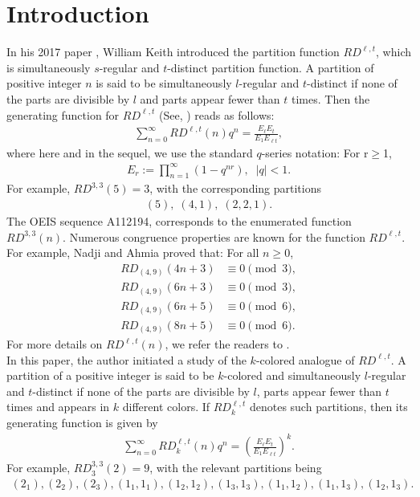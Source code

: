 \documentclass[11pt,a4paper]{article}
\numberwithin{equation}{section}
\theoremstyle{plain}
\begin{document}
	\section {Introduction}
	In his 2017 paper \cite{keith}, William Keith introduced the partition function $RD^{\ell,t}$, which is simultaneously $s$-regular and $t$-distinct partition function. 
	A partition of positive integer $n$ is said to be simultaneously $l$-regular and $t$-distinct if none of the parts are divisible by $l$ and parts appear fewer than $t$ times. Then the generating function for $RD^{\ell,t}$ (See, {{\cite[Th.3]{keith}}}) reads as follows:
	\begin{align*}
		\sum_{n=0}^{\infty} RD^{\ell,t}(n)q^n=
		\frac{E_{\ell}E_t}{E_1E_{\ell t}},
	\end{align*}
	where here and in the sequel, we use the standard $q$-series notation:
 For r$\geq$1, 
	\begin{align*}
		E_r:= \prod_{n=1}^{\infty}(1-q^{nr}), \;\; |q|<1.
	\end{align*}
	For example, $RD^{3,3}(5)=3$, with the corresponding partitions
	\begin{align*}
		(5),\;(4,1),\;(2,2,1).
	\end{align*}
	The OEIS sequence A112194, corresponds to the enumerated function $RD^{3,3}(n)$. Numerous congruence properties are known for the function  $RD^{\ell,t}$. For example, Nadji and Ahmia \cite{Ahmia 1 } proved that:
	For all $n \geq 0$,
	\begin{align*}
		RD_{(4,9)}(4n+3) &\equiv 0 \pmod{3},\\
		RD_{(4,9)}(6n+3) &\equiv 0 \pmod{3},\\
		RD_{(4,9)}(6n+5) &\equiv 0 \pmod{6},\\
		RD_{(4,9)}(8n+5) &\equiv 0 \pmod{6}.
		\end{align*}
	For more details on $RD^{\ell,t}(n)$, we refer the readers to \cite{keith2,keith,Ahmia 2}.\\
	In this paper, the author initiated a study of the $k$-colored analogue of $RD^{\ell,t}$.
	A partition of a positive integer  is said to be $k$-colored and simultaneously $l$-regular and  $t$-distinct if none of the parts are divisible by $l$, parts appear fewer than $t$ times and appears in $k$ different colors. If $RD_k^{\ell,t}$ denotes such partitions, then its generating function is given by
	\begin{align}\label{Gf}
		\sum_{n=0}^{\infty} RD_k^{\ell,t}(n)q^n=\left(\frac{E_{\ell}E_t}{E_1E_{\ell t}}\right)^k.
	\end{align}
For example, $RD_3^{3,3}(2)=9$, with the relevant partitions being
\begin{align*}
(2_1),(2_2),(2_3),(1_1,1_1),(1_2,1_2),(1_3,1_3),(1_1,1_2),(1_1,1_3),(1_2,1_3).
\end{align*}
\end{document}
